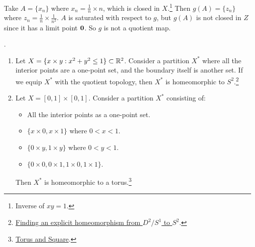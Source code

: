 Take \(A = \{x_n\}\) where \(x_n = \frac{1}{n} \times n\), which is closed in \(X\).\footnote{Inverse of \(xy = 1\).} Then \(g(A) = \{z_n\}\) where \(z_n = \frac{1}{n} \times \frac{1}{n^2}\). \(A\) is saturated with respect to \(g\), but \(g(A)\) is not closed in \(Z\) since it has a limit point \(\bf{0}\). So \(g\) is not a quotient map.

\ex.
\begin{enumerate}
    \item Let \(X = \{x \times y : x^2 + y^2 \leq 1\} \subset \R^2\). Consider a partition \(X^*\) where all the interior points are a one-point set, and the boundary itself is another set. If we equip \(X^*\) with the quotient topology, then \(X^*\) is homeomorphic to \(S^2\).\footnote{\href{https://math.stackexchange.com/q/4274691}{Finding an explicit homeomorphism from \(D^2/S^1\) to \(S^2\)}.}
    \item Let \(X = [0, 1] \times [0, 1]\). Consider a partition \(X^*\) consisting of:
          \begin{itemize}
              \item All the interior points as a one-point set.
              \item \(\{x \times 0, x \times 1\}\) where \(0 < x < 1\).
              \item \(\{0 \times y, 1 \times y\}\) where \(0 < y < 1\).
              \item \(\{0 \times 0, 0 \times 1, 1 \times 0, 1 \times 1\}\).
          \end{itemize}
          Then \(X^*\) is homeomorphic to a torus.\footnote{\href{https://math.stackexchange.com/q/362204/329909}{Torus and Square}.}
\end{enumerate}
\pagebreak
